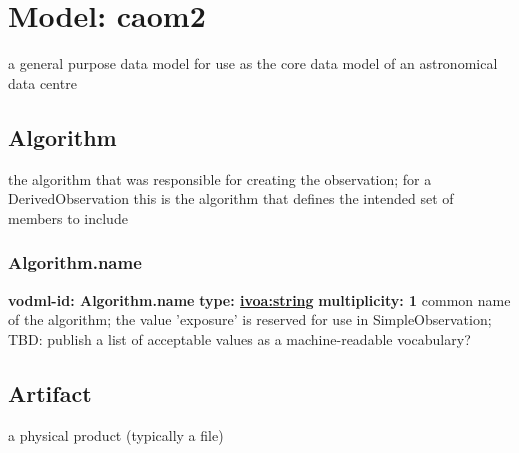 
%



    
    

\pagebreak
\section{Model: caom2 }
  

  a general purpose data model for use as the core data model of an astronomical data centre

  \subsection{Algorithm}
  \label{sect:Algorithm}
    the algorithm that was responsible for creating the observation; for a DerivedObservation this is the algorithm that defines the intended set of members to include

    \subsubsection{Algorithm.name}
      \textbf{vodml-id: Algorithm.name} \newline
      \textbf{type: \hyperref[sect:ivoa]{ivoa:string}} \newline
      \textbf{multiplicity: 1} \newline
      common name of the algorithm; the value 'exposure' is reserved for use in SimpleObservation; TBD: publish a list of acceptable values as a machine-readable vocabulary?

  \subsection{Artifact}
  \label{sect:Artifact}
    a physical product (typically a file)

